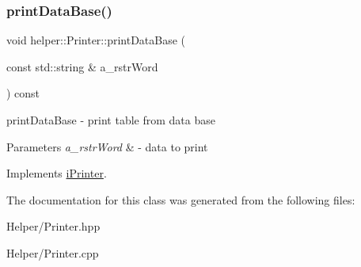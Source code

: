 \subsubsection{\texorpdfstring{printDataBase()}{printDataBase()}}
{\footnotesize\ttfamily void helper\+::\+Printer\+::print\+Data\+Base (\begin{DoxyParamCaption}\item[{const std\+::string \&}]{a\+\_\+rstr\+Word }\end{DoxyParamCaption}) const\hspace{0.3cm}{\ttfamily [virtual]}}



print\+Data\+Base -\/ print table from data base 


\begin{DoxyParams}{Parameters}
{\em a\+\_\+rstr\+Word} & -\/ data to print \\
\hline
\end{DoxyParams}


Implements \mbox{\hyperlink{classi_printer}{i\+Printer}}.



The documentation for this class was generated from the following files\+:\begin{DoxyCompactItemize}
\item 
Helper/Printer.\+hpp\item 
Helper/Printer.\+cpp\end{DoxyCompactItemize}
